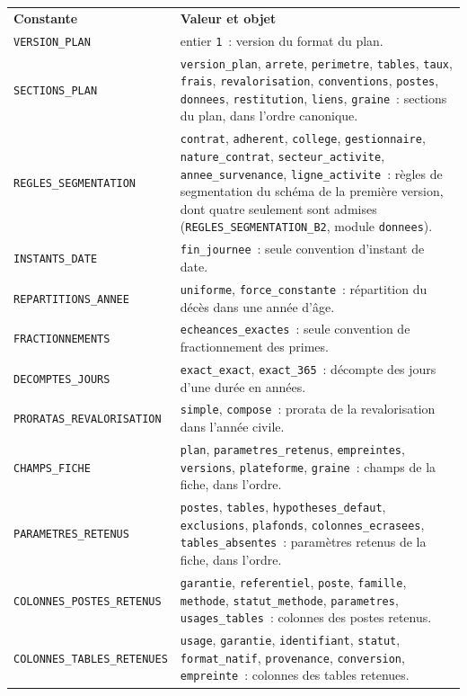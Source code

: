 \documentclass[a4paper,11pt]{article}
\newcommand{\code}[1]{\texttt{\small #1}}
\begin{document}
\begin{center}
\small
{}
\begin{tabular}{@{}p{5.6cm}p{9.5cm}@{}}
\rowcolor{tableheader}
\textcolor{financeblue}{\textbf{Constante}} & \textcolor{financeblue}{\textbf{Valeur et objet}} \\
\code{VERSION\_PLAN} & entier \code{1}~: version du format du plan. \\
\code{SECTIONS\_PLAN} & \code{version\_plan}, \code{arrete}, \code{perimetre}, \code{tables}, \code{taux}, \code{frais}, \code{revalorisation}, \code{conventions}, \code{postes}, \code{donnees}, \code{restitution}, \code{liens}, \code{graine}~: sections du plan, dans l'ordre canonique. \\
\code{REGLES\_SEGMENTATION} & \code{contrat}, \code{adherent}, \code{college}, \code{gestionnaire}, \code{nature\_contrat}, \code{secteur\_activite}, \code{annee\_survenance}, \code{ligne\_activite}~: règles de segmentation du schéma de la première version, dont quatre seulement sont admises (\code{REGLES\_SEGMENTATION\_B2}, module \code{donnees}). \\
\code{INSTANTS\_DATE} & \code{fin\_journee}~: seule convention d'instant de date. \\
\code{REPARTITIONS\_ANNEE} & \code{uniforme}, \code{force\_constante}~: répartition du décès dans une année d'âge. \\
\code{FRACTIONNEMENTS} & \code{echeances\_exactes}~: seule convention de fractionnement des primes. \\
\code{DECOMPTES\_JOURS} & \code{exact\_exact}, \code{exact\_365}~: décompte des jours d'une durée en années. \\
\code{PRORATAS\_REVALORISATION} & \code{simple}, \code{compose}~: prorata de la revalorisation dans l'année civile. \\
\code{CHAMPS\_FICHE} & \code{plan}, \code{parametres\_retenus}, \code{empreintes}, \code{versions}, \code{plateforme}, \code{graine}~: champs de la fiche, dans l'ordre. \\
\code{PARAMETRES\_RETENUS} & \code{postes}, \code{tables}, \code{hypotheses\_defaut}, \code{exclusions}, \code{plafonds}, \code{colonnes\_ecrasees}, \code{tables\_absentes}~: paramètres retenus de la fiche, dans l'ordre. \\
\code{COLONNES\_POSTES\_RETENUS} & \code{garantie}, \code{referentiel}, \code{poste}, \code{famille}, \code{methode}, \code{statut\_methode}, \code{parametres}, \code{usages\_tables}~: colonnes des postes retenus. \\
\code{COLONNES\_TABLES\_RETENUES} & \code{usage}, \code{garantie}, \code{identifiant}, \code{statut}, \code{format\_natif}, \code{provenance}, \code{conversion}, \code{empreinte}~: colonnes des tables retenues. \\
\end{tabular}
\end{center}
\end{document}
